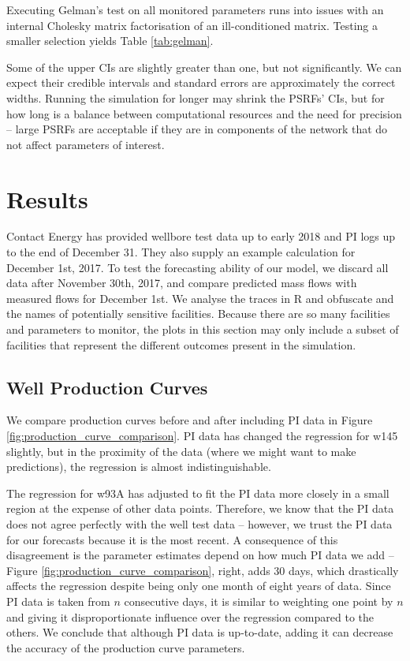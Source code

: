 \documentclass[a4paper, 12pt]{article}
\begin{document}
Executing Gelman's test on all monitored parameters runs into issues with an internal Cholesky matrix factorisation of an ill-conditioned matrix. Testing a smaller selection yields Table \ref{tab:gelman}.



Some of the upper CIs are slightly greater than one, but not significantly. We can expect their credible intervals and standard errors are approximately the correct widths. Running the simulation for longer may shrink the PSRFs' CIs, but for how long is a balance between computational resources and the need for precision -- large PSRFs are acceptable if they are in components of the network that do not affect parameters of interest.

\section{Results}
Contact Energy has provided wellbore test data up to early 2018 and PI logs up to the end of December 31. They also supply an example calculation for December 1st, 2017. To test the forecasting ability of our model, we discard all data after November 30th, 2017, and compare predicted mass flows with measured flows for December 1st. We analyse the traces in R and obfuscate and the names of potentially sensitive facilities. Because there are so many facilities and parameters to monitor, the plots in this section may only include a subset of facilities that represent the different outcomes present in the simulation.

\subsection{Well Production Curves}

We compare production curves before and after including PI data in Figure \ref{fig:production_curve_comparison}. PI data has changed the regression for w145 slightly, but in the proximity of the data (where we might want to make predictions), the regression is almost indistinguishable.

The regression for w93A has adjusted to fit the PI data more closely in a small region at the expense of other data points. Therefore, we know that the PI data does not agree perfectly with the well test data -- however, we trust the PI data for our forecasts because it is the most recent. A consequence of this disagreement is the parameter estimates depend on how much PI data we add -- Figure \ref{fig:production_curve_comparison}, right, adds 30 days, which drastically affects the regression despite being only one month of eight years of data. Since PI data is taken from $n$ consecutive days, it is similar to weighting one point by $n$ and giving it disproportionate influence over the regression compared to the others. We conclude that although PI data is up-to-date, adding it can decrease the accuracy of the production curve parameters.
\end{document}

